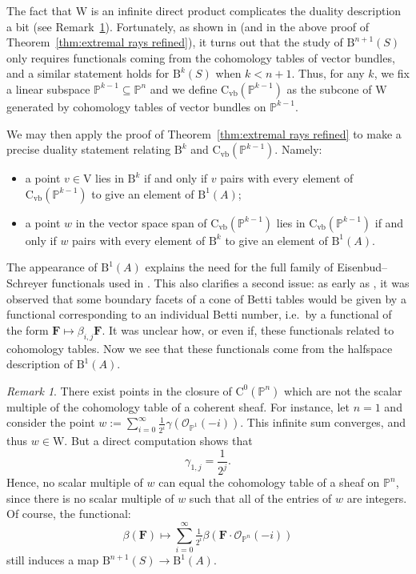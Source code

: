 \documentclass[12pt]{amsart}
\theoremstyle{definition}
\theoremstyle{remark}
\newtheorem{remark}[lemma]{Remark}
\newcommand{\PP}{\mathbb{P}}
\newcommand{\VV}{\mathrm{V}}
\newcommand{\WW}{\mathrm{W}}
\newcommand{\cO}{\mathcal{O}}
\newcommand{\FF}{\mathbf{F}}
\newcommand{\CQ}{\mathrm{C}}
\newcommand{\CvbQ}{\mathrm{C}_{\text{vb}}}
\newcommand{\BBQ}{\mathrm{B}}
\begin{document}
The fact that $\WW$ is an infinite direct product complicates the duality description a bit (see Remark~\ref{rmk:issues}).  Fortunately, as shown in \cite{eis-schrey1} (and in the above proof of Theorem~\ref{thm:extremal rays refined}), it turns out that the study of $\BBQ^{n+1}(S)$ only requires functionals coming from the cohomology tables of vector bundles, and a similar statement holds for $\BBQ^{k}(S)$ when $k<n+1$.  Thus, for any $k$, we fix a linear subspace $\PP^{k-1}\subseteq \PP^n$ and we define $\CvbQ(\PP^{k-1})$ as the subcone of $\WW$ generated by cohomology tables of vector bundles on $\PP^{k-1}$.

We may then apply the proof of Theorem~\ref{thm:extremal rays refined} to make a precise duality statement relating $\BBQ^{k}$ and $\CvbQ(\PP^{k-1})$.  Namely:
\begin{itemize}
	\item a point $v\in \VV$ lies in $\BBQ^{k}$ if and only if $v$ pairs with every element of $\CvbQ(\PP^{k-1})$ to give an element of $\BBQ^1(A)$;
	\item a point $w$ in the vector space span of $\CvbQ(\PP^{k-1})$ lies in $\CvbQ(\PP^{k-1})$ if and only if $w$ pairs with every element of $\BBQ^{k}$ to give an element of $\BBQ^1(A)$.
\end{itemize}

The appearance of $\BBQ^1(A)$ explains the need for the full family of Eisenbud--Schreyer functionals used in \cite{eis-schrey1}.  This also clarifies a second   issue: as early as \cite[Proposition~2.12]{boij-sod1}, it was observed that some boundary facets of a cone of Betti tables would be given by a functional corresponding to an individual Betti number, i.e.\ by a functional of the form $\FF\mapsto \beta_{i,j}\FF$.  It was unclear how, or even if, these functionals related to cohomology tables.  Now we see that these functionals come from the halfspace description of $\BBQ^1(A)$.

\begin{remark}\label{rmk:issues}
There exist points in the closure of $\CQ^0(\PP^n)$ which are not the scalar multiple of the cohomology table of a coherent sheaf.   For instance, let $n=1$ and consider the point $w:=\sum_{i=0}^\infty \frac{1}{2^i} \gamma(\cO_{\PP^1}(-i))$.  
This infinite sum converges, and thus $w\in \WW$.  But a direct computation shows that
\[
\gamma_{1,j}=\frac{1}{2^{j}}.
\]
Hence, no scalar multiple of $w$ can equal the cohomology table of a sheaf on $\PP^n$, since there is no scalar multiple of $w$ such that all of the entries of $w$ are integers.  Of course, the functional:
\[
\beta(\FF)\mapsto \sum_{i=0}^\infty \tfrac{1}{2^i} \beta(\FF\cdot \cO_{\PP^n}(-i))
\]
still induces a map $\BBQ^{n+1}(S)\to \BBQ^1(A)$.
%
\end{remark}
\end{document}
